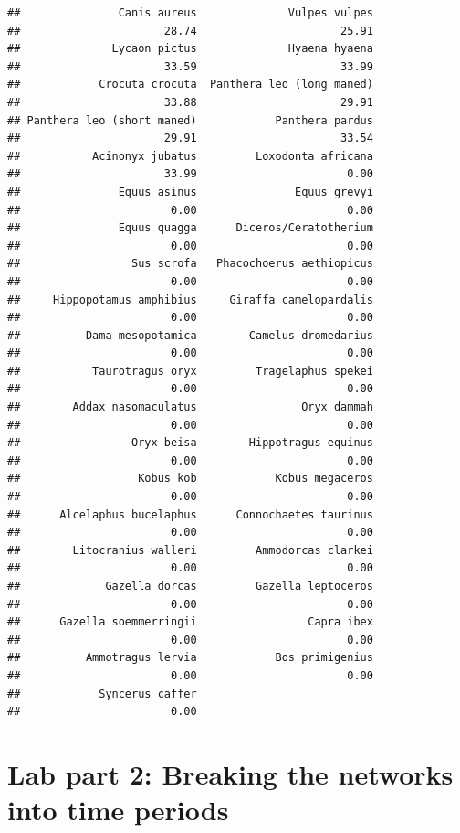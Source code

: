 \documentclass[
]{article}
\begin{document}
\begin{verbatim}
##               Canis aureus              Vulpes vulpes 
##                      28.74                      25.91 
##              Lycaon pictus              Hyaena hyaena 
##                      33.59                      33.99 
##            Crocuta crocuta  Panthera leo (long maned) 
##                      33.88                      29.91 
## Panthera leo (short maned)            Panthera pardus 
##                      29.91                      33.54 
##           Acinonyx jubatus         Loxodonta africana 
##                      33.99                       0.00 
##               Equus asinus               Equus grevyi 
##                       0.00                       0.00 
##               Equus quagga      Diceros/Ceratotherium 
##                       0.00                       0.00 
##                 Sus scrofa   Phacochoerus aethiopicus 
##                       0.00                       0.00 
##     Hippopotamus amphibius     Giraffa camelopardalis 
##                       0.00                       0.00 
##          Dama mesopotamica        Camelus dromedarius 
##                       0.00                       0.00 
##           Taurotragus oryx         Tragelaphus spekei 
##                       0.00                       0.00 
##        Addax nasomaculatus                Oryx dammah 
##                       0.00                       0.00 
##                 Oryx beisa        Hippotragus equinus 
##                       0.00                       0.00 
##                  Kobus kob            Kobus megaceros 
##                       0.00                       0.00 
##      Alcelaphus bucelaphus      Connochaetes taurinus 
##                       0.00                       0.00 
##        Litocranius walleri         Ammodorcas clarkei 
##                       0.00                       0.00 
##             Gazella dorcas         Gazella leptoceros 
##                       0.00                       0.00 
##      Gazella soemmerringii                 Capra ibex 
##                       0.00                       0.00 
##          Ammotragus lervia            Bos primigenius 
##                       0.00                       0.00 
##            Syncerus caffer 
##                       0.00
\end{verbatim}

\section{Lab part 2: Breaking the networks into time
periods}\label{lab-part-2-breaking-the-networks-into-time-periods}
\end{document}
